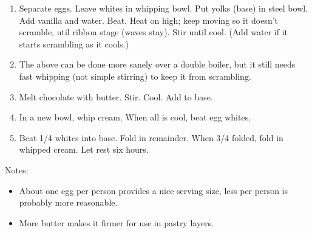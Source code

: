 
\begin{ingredients}
\end{ingredients}


\begin{recipe}
  \begin{enumerate}
  \item Separate eggs.  Leave whites in whipping bowl.  Put yolks
(base) in steel bowl.  Add vanilla and water.  Beat.  Heat on high;
keep moving so it doesn't scramble, util ribbon stage (waves stay).
Stir until cool.  (Add water if it starts scrambling as it cools.)

\item The above can be done more sanely over a double boiler, but it still
needs fast whipping (not simple stirring) to keep it from scrambling.

\item Melt chocolate with butter.  Stir.  Cool.  Add to base.

\item In a new bowl, whip cream.  When all is cool, beat egg whites.

\item Beat 1/4 whites into base.  Fold in remainder.  When 3/4 folded, fold
in whipped cream.  Let rest six hours.

  \end{enumerate}

Notes:
\begin{itemize}
\item About one egg per person provides a nice serving size, less per
  person is probably more reasonable.

\item More butter makes it firmer for use in pastry layers.

\end{itemize}

\end{recipe}


